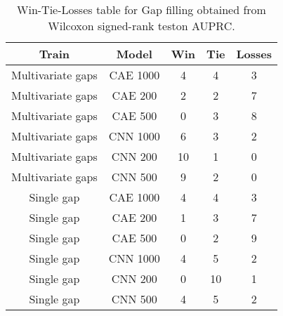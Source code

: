 \begin{table}[H]
\centering
\begin{tabular}{|c|c|c|c|c|}

    \textbf{Train} & \textbf{Model} &  \textbf{Win} &  \textbf{Tie} &  \textbf{Losses} \\
\hline

 Multivariate gaps &       CAE 1000 &             4 &             4 &                3 \\
\hline
 Multivariate gaps &        CAE 200 &             2 &             2 &                7 \\
\hline
 Multivariate gaps &        CAE 500 &             0 &             3 &                8 \\
\hline
 Multivariate gaps &       CNN 1000 &             6 &             3 &                2 \\
\hline
 Multivariate gaps &        CNN 200 &            10 &             1 &                0 \\
\hline
 Multivariate gaps &        CNN 500 &             9 &             2 &                0 \\
\hline
        Single gap &       CAE 1000 &             4 &             4 &                3 \\
\hline
        Single gap &        CAE 200 &             1 &             3 &                7 \\
\hline
        Single gap &        CAE 500 &             0 &             2 &                9 \\
\hline
        Single gap &       CNN 1000 &             4 &             5 &                2 \\
\hline
        Single gap &        CNN 200 &             0 &            10 &                1 \\
\hline
        Single gap &        CNN 500 &             4 &             5 &                2 \\
\hline

\end{tabular}
\caption{Win-Tie-Losses table for Gap filling obtained from Wilcoxon signed-rank teston AUPRC.}
\label{tab:gap_filling_model_training_data_comparison}
\end{table}